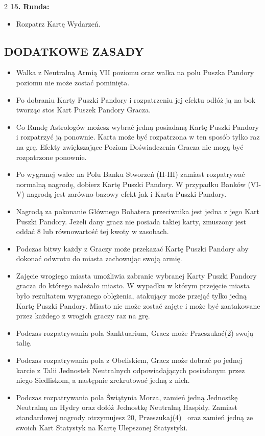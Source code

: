 \begin{multicols*}{2}
\textbf{15. Runda:}
\begin{itemize}
  \item Rozpatrz Kartę Wydarzeń.
\end{itemize}


\subsection*{\MakeUppercase{DODATKOWE ZASADY}}

\begin{itemize}
    \item Walka z Neutralną Armią VII poziomu oraz walka na polu Puszka Pandory poziomu nie może zostać pominięta.
    \item Po dobraniu Karty Puszki Pandory i rozpatrzeniu jej efektu odłóż ją na bok tworząc stos Kart Puszek Pandory Gracza.
    \item Co Rundę Astrologów możesz wybrać jedną posiadaną Kartę Puszki Pandory i rozpatrzyć ją ponownie. Karta może być rozpatrzona w ten sposób tylko raz na grę. Efekty zwiększające Poziom Doświadczenia Gracza nie mogą być rozpatrzone ponownie.
    \item Po wygranej walce na Polu Banku Stworzeń (II-III) zamiast rozpatrywać normalną nagrodę, dobierz Kartę Puszki Pandory. W przypadku Banków (VI-V) nagrodą jest zarówno bazowy efekt jak i Karta Puszki Pandory.
    \item Nagrodą za pokonanie Głównego Bohatera przeciwnika jest jedna z jego Kart Puszki Pandory. Jeżeli dany gracz nie posiada takiej karty, zmuszony jest oddać 8  lub równowartość tej kwoty w zasobach. 
    \item Podczas bitwy każdy z Graczy może przekazać Kartę Puszki Pandory aby dokonać odwrotu do miasta zachowując swoją armię.
    \item Zajęcie wrogiego miasta umożliwia zabranie wybranej Karty Puszki Pandory gracza do którego należało miasto. W wypadku w którym przejęcie miasta było rezultatem wygranego oblężenia, atakujący może przejąć tylko jedną Kartę Puszki Pandory. Miasto nie może zostać zajęte i może być zaatakowane przez każdego z wrogich graczy raz na grę.
    \item Podczas rozpatrywania pola Sanktuarium, Gracz może Przeszukać(2) swoją talię.
    \item Podczas rozpatrywania pola z Obeliskiem, Gracz może dobrać po jednej karcie z Talii Jednostek Neutralnych odpowiadających posiadanym przez niego Siedliskom, a następnie zrekrutować jedną z nich.
    \item Podczas rozpatrywania pola Świątynia Morza, zamień jedną  Jednostkę Neutralną na Hydry oraz dołóż Jednostkę Neutralną Haspidy. Zamiast standardowej nagrody otrzymujesz 20, Przeszukaj(4)~ oraz zamień jedną ze swoich Kart Statystyk na Kartę Ulepszonej Statystyki.

\end{itemize}
\end{multicols*}
